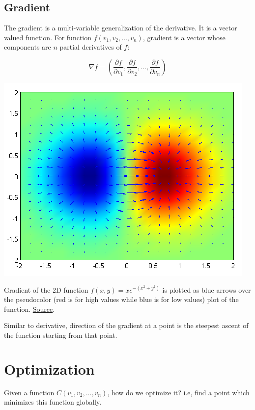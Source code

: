 \documentclass[a4paper]{tufte-handout}
\begin{document}
\subsection{Gradient}\label{gradient}

The gradient is a multi-variable generalization of the derivative. It is
a vector valued function. For function \(f(v_1, v_2, \ldots, v_n)\),
gradient is a vector whose components are \(n\) partial derivatives of
\(f\):

\[ \nabla f = (\frac{\partial f}{\partial v_1 }, \frac{\partial f}{\partial v_2 }, \ldots, \frac{\partial f}{\partial v_n })\]


\begin{marginfigure}
  \includegraphics[width=\linewidth]{gradient.png}
  \caption{Gradient of the 2D function \(f(x, y) = xe^{−(x^2 + y^2)}\) is
plotted as blue arrows over the pseudocolor (red is for high values
while blue is for low values) plot of the function.
\href{https://en.wikipedia.org/wiki/Gradient}{Source}.}
\end{marginfigure}


Similar to derivative, direction of the gradient at a point is the
steepest ascent of the function starting from that point.

\section{Optimization}\label{optimization}

Given a function \(C(v_1, v_2, \ldots, v_n)\), how do we optimize it?
i.e, find a point which minimizes this function globally.
\end{document}
